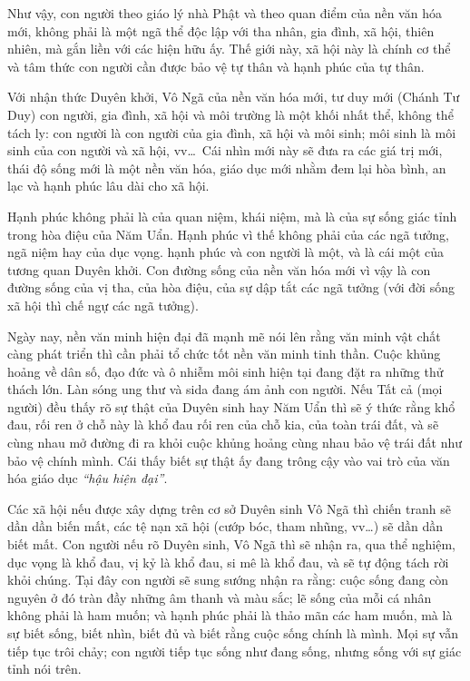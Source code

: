 Như vậy, con người theo giáo lý nhà Phật và theo quan điểm của nền văn hóa mới, không phải là một ngã thể độc lập với tha nhân, gia đình, xã hội, thiên nhiên, mà gắn liền với các hiện hữu ấy. Thế giới này, xã hội này là chính cơ thể và tâm thức con người cần được bảo vệ tự thân và hạnh phúc của tự thân.

Với nhận thức Duyên khởi, Vô Ngã của nền văn hóa mới, tư duy mới (Chánh Tư Duy) con người, gia đình, xã hội và môi trường là một khối nhất thể, không thể tách ly: con người là con người của gia đình, xã hội và môi sinh; môi sinh là môi sinh của con người và xã hội, vv\ldots ~Cái nhìn mới này sẽ đưa ra các giá trị mới, thái độ sống mới là một nền văn hóa, giáo dục mới nhằm đem lại hòa bình, an lạc và hạnh phúc lâu dài cho xã hội.

Hạnh phúc không phải là của quan niệm, khái niệm, mà là của sự sống giác tỉnh trong hòa điệu của Năm Uẩn. Hạnh phúc vì thế không phải của các ngã tưởng, ngã niệm hay của dục vọng. hạnh phúc và con người là một, và là cái một của tương quan Duyên khởi. Con đường sống của nền văn hóa mới vì vậy là con đường sống của vị tha, của hòa điệu, của sự dập tắt các ngã tưởng (với đời sống xã hội thì chế ngự các ngã tưởng).

Ngày nay, nền văn minh hiện đại đã mạnh mẽ nói lên rằng văn minh vật chất càng phát triển thì cần phải tổ chức tốt nền văn minh tinh thần. Cuộc khủng hoảng về dân số, đạo đức và ô nhiễm môi sinh hiện tại đang đặt ra những thử thách lớn. Làn sóng ung thư và sida đang ám ảnh con người. Nếu Tất cả (mọi người) đều thấy rõ sự thật của Duyên sinh hay Năm Uẩn thì sẽ ý thức rằng khổ đau, rối ren ở chỗ này là khổ đau rối ren của chỗ kia, của toàn trái đất, và sẽ cùng nhau mở đường đi ra khỏi cuộc khủng hoảng cùng nhau bảo vệ trái đất như bảo vệ chính mình. Cái thấy biết sự thật ấy đang trông cậy vào vai trò của văn hóa giáo dục \emph{``hậu hiện đại''}.

Các xã hội nếu được xây dựng trên cơ sở Duyên sinh Vô Ngã thì chiến tranh sẽ dần dần biến mất, các tệ nạn xã hội (cướp bóc, tham nhũng, vv\ldots) sẽ dần dần biết mất. Con người nếu rõ Duyên sinh, Vô Ngã thì sẽ nhận ra, qua thể nghiệm, dục vọng là khổ đau, vị kỷ là khổ đau, si mê là khổ đau, và sẽ tự động tách rời khỏi chúng. Tại đây con người sẽ sung sướng nhận ra rằng: cuộc sống đang còn nguyên ở đó tràn đầy những âm thanh và màu sắc; lẽ sống của mỗi cá nhân không phải là ham muốn; và hạnh phúc phải là thảo mãn các ham muốn, mà là sự biết sống, biết nhìn, biết đủ và biết rằng cuộc sống chính là mình. Mọi sự vẫn tiếp tục trôi chảy; con người tiếp tục sống như đang sống, nhưng sống với sự giác tỉnh nói trên.

